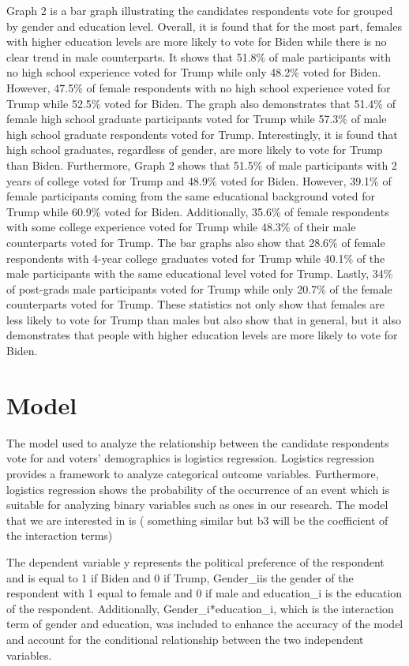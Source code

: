 \documentclass[
  letterpaper,
  DIV=11,
  numbers=noendperiod]{scrartcl}
\begin{document}
Graph 2 is a bar graph illustrating the candidates respondents vote for
grouped by gender and education level. Overall, it is found that for the
most part, females with higher education levels are more likely to vote
for Biden while there is no clear trend in male counterparts. It shows
that 51.8\% of male participants with no high school experience voted
for Trump while only 48.2\% voted for Biden. However, 47.5\% of female
respondents with no high school experience voted for Trump while 52.5\%
voted for Biden. The graph also demonstrates that 51.4\% of female high
school graduate participants voted for Trump while 57.3\% of male high
school graduate respondents voted for Trump. Interestingly, it is found
that high school graduates, regardless of gender, are more likely to
vote for Trump than Biden. Furthermore, Graph 2 shows that 51.5\% of
male participants with 2 years of college voted for Trump and 48.9\%
voted for Biden. However, 39.1\% of female participants coming from the
same educational background voted for Trump while 60.9\% voted for
Biden. Additionally, 35.6\% of female respondents with some college
experience voted for Trump while 48.3\% of their male counterparts voted
for Trump. The bar graphs also show that 28.6\% of female respondents
with 4-year college graduates voted for Trump while 40.1\% of the male
participants with the same educational level voted for Trump. Lastly,
34\% of post-grads male participants voted for Trump while only 20.7\%
of the female counterparts voted for Trump. These statistics not only
show that females are less likely to vote for Trump than males but also
show that in general, but it also demonstrates that people with higher
education levels are more likely to vote for Biden.

\hypertarget{model}{%
\section{Model}\label{model}}

The model used to analyze the relationship between the candidate
respondents vote for and voters' demographics is logistics regression.
Logistics regression provides a framework to analyze categorical outcome
variables. Furthermore, logistics regression shows the probability of
the occurrence of an event which is suitable for analyzing binary
variables such as ones in our research. The model that we are interested
in is ( something similar but b3 will be the coefficient of the
interaction terms)

The dependent variable y represents the political preference of the
respondent and is equal to 1 if Biden and 0 if Trump, Gender\_iis the
gender of the respondent with 1 equal to female and 0 if male and
education\_i is the education of the respondent. Additionally,
Gender\_i*education\_i, which is the interaction term of gender and
education, was included to enhance the accuracy of the model and account
for the conditional relationship between the two independent variables.
\end{document}
